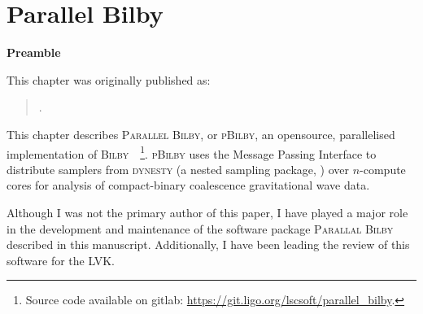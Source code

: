 \chapter[Parallel Bilby]{Parallel Bilby}
\label{ch.pbilby}

\textbf{Preamble}

This chapter was originally published as:

\begin{quote}
.
\end{quote}

This chapter describes \textsc{Parallel Bilby}, or \textsc{pBilby}, an opensource, parallelised implementation of \textsc{Bilby}~\cite{bilby_paper, pbilby}~\footnote{Source code available on gitlab: \url{https://git.ligo.org/lscsoft/parallel_bilby}.}. 
\textsc{pBilby} uses the Message Passing Interface \cite{mpi} to distribute samplers from \textsc{dynesty} (a nested sampling package, \cite{dynesty_paper}) over $n$-compute cores for analysis of compact-binary coalescence gravitational wave data.

Although I was not the primary author of this paper, I have played a major role in the development and maintenance of the software package \textsc{Parallal Bilby} described in this manuscript. 
Additionally, I have been leading the review of this software for the LVK. 




